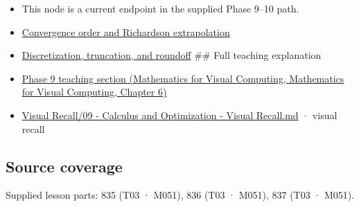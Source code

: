 \begin{itemize}
\item
  This node is a current endpoint in the supplied Phase 9--10 path.
\item
  \hyperref[appendix-aca80b6bf17a]{Convergence order and Richardson extrapolation}
\item
  \hyperref[appendix-6b0648b2b8e8]{Discretization, truncation, and roundoff} \#\# Full teaching explanation
\item
  \href{../02-Mathematics-for-Visual-Computing/main.pdf\#nameddest=02-foundations-ii-ch022-integration-and-quadrature}{Phase 9 teaching section (Mathematics for Visual Computing, Mathematics for Visual Computing, Chapter 6)}
\item
  \hyperref[appendix-adf48f5dc5c1]{Visual Recall/09 - Calculus and Optimization - Visual Recall.md} · visual recall
\end{itemize}

\subsection{Source coverage}\label{appendix-80521eae6b71-source-coverage}

Supplied lesson parts: 835 (T03 · M051), 836 (T03 · M051), 837 (T03 · M051).
